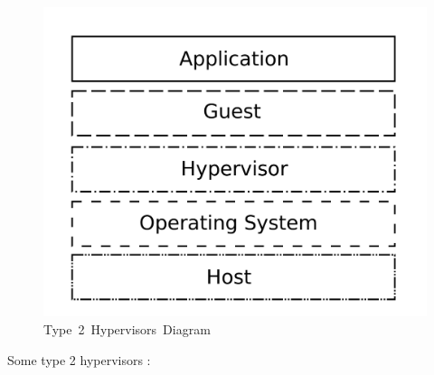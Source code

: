 \documentclass[
  14pt,
  english,
  a4paper,
]{scrreprt}
\begin{document}
\begin{figure}
\hypertarget{fig:type2hyp}{%
\centering
\includegraphics[width=1\textwidth,height=\textheight]{figures/Type-2-Hyp.png}
\caption{Type~2~Hypervisors~Diagram}\label{fig:type2hyp}
}
\end{figure}

Some type 2 hypervisors :
\end{document}
